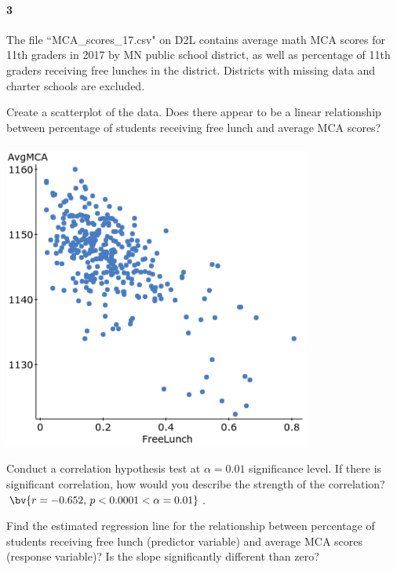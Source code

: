 \documentclass{article}
\begin{document}
\begin{flushleft}
\paragraph{3} The file ``MCA\_scores\_17.csv" on D2L contains average math MCA scores for 11th graders in 2017 by MN public school district, as well as percentage of 11th graders receiving free lunches in the district. Districts with missing data and charter schools are excluded.
\begin{enumalpha}
\item Create a scatterplot of the data. Does there appear to be a linear relationship between percentage of students receiving free lunch and average MCA scores?\\
\medskip
{}\\
\medskip
\includegraphics[width=4in]{images/grp10_Q3_a}
\vspace{.5in}
\item Conduct a correlation hypothesis test at $\alpha = 0.01$ significance level. If there is significant correlation, how would you describe the strength of the correlation?\\
\medskip
$\bv{r = -0.652, \, p <0.0001 < \alpha = 0.01}$. 
\newpage
\item Find the estimated regression line for the relationship between percentage of students receiving free lunch (predictor variable) and average MCA scores (response variable)? Is the slope significantly different than zero?\\

\end{enumalpha}
\end{flushleft}
\end{document}
